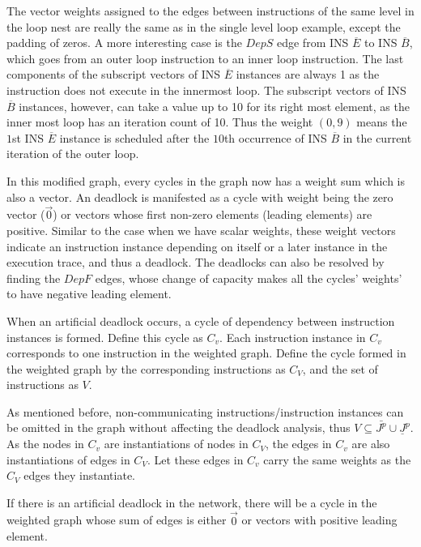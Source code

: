 The vector weights assigned to the edges between instructions of
the same level in the loop nest are really the same as in the single level loop
example, except the padding of zeros. A more interesting case is the $DepS$ edge from INS $\overline{E}$ to INS $\overline{B}$, which goes from an outer loop instruction to an inner loop instruction. 
The last components of the subscript vectors of INS $\overline{E}$ instances are always 1
as the instruction does not execute in the innermost loop. The subscript vectors of INS $\overline{B}$ instances, however, can take a value up to 10 for its right most element, as the inner most loop has an iteration count of 10. Thus the weight $(0,9)$
means the $1$st INS $\overline{E}$ instance is scheduled after the $10$th occurrence of INS $\overline{B}$ in the current iteration of the outer loop.

In this modified graph, 
every cycles in the graph now has a weight sum which is also a vector. 
An deadlock is manifested as a cycle with weight being the zero vector ($\vec{0}$)
or vectors whose first non-zero elements (leading elements) are positive.
Similar to the case when we have scalar
weights, these weight vectors 
indicate an instruction instance depending on itself or a later instance in the execution trace, and thus a deadlock. The deadlocks can also be
resolved by finding the $DepF$ edges, whose change of capacity makes
all the cycles' weights' to have negative  leading element. 


\begin{definition}
When an artificial deadlock occurs, a cycle of dependency between instruction instances is formed. Define this cycle as $C_v$. Each instruction instance in $C_v$ corresponds to one instruction in the weighted graph. Define the cycle formed in the weighted graph by the corresponding instructions as $C_V$, and the set of instructions
as $V$. 
\end{definition}

As mentioned before, non-communicating instructions/instruction instances can be omitted in the graph without affecting the deadlock analysis, thus $V \subseteq \bar{J^p} \cup \underline{J}^p$. As the nodes in $C_v$ are instantiations of nodes in $C_V$, the edges in $C_v$ are also
instantiations of edges in $C_V$. Let these edges in $C_v$ carry the same weights as the $C_V$ edges they instantiate.

\begin{lemma}
\label{deadlock2cycle}
If there is an artificial deadlock in the network, there will be a cycle in
the weighted graph whose sum of edges
is either $\vec{0}$ or vectors with positive leading element. 
\end{lemma}

